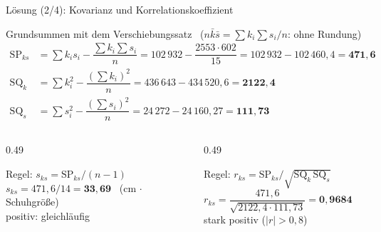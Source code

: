 \documentclass[aspectratio=169,11pt]{beamer}
\newcommand{\SQk}{\text{SQ}_k}
\newcommand{\SQs}{\text{SQ}_s}
\newcommand{\SPks}{\text{SP}_{ks}}
\begin{document}
\begin{frame}{Lösung (2/4): Kovarianz und Korrelationskoeffizient}
  \begin{block}{Grundsummen mit dem Verschiebungssatz \ ($n\bar{k}\bar{s} = \sum k_i \sum s_i / n$: ohne Rundung)}
    \vspace{-8pt}
    \begin{align*}
      \SPks &= \textstyle\sum k_i s_i - \dfrac{\sum k_i \sum s_i}{n} = 102\,932 - \dfrac{2553 \cdot 602}{15} = 102\,932 - 102\,460{,}4 = \mathbf{471{,}6} \\
      \SQk  &= \textstyle\sum k_i^{2} - \dfrac{(\sum k_i)^{2}}{n} = 436\,643 - 434\,520{,}6 = \mathbf{2122{,}4} \\
      \SQs  &= \textstyle\sum s_i^{2} - \dfrac{(\sum s_i)^{2}}{n} = 24\,272 - 24\,160{,}27 = \mathbf{111{,}73}
    \end{align*}
    \vspace{-14pt}
  \end{block}

  \begin{columns}[T]
    \begin{column}{0.49\textwidth}
      \begin{block}{Regel: $s_{ks} = \SPks / (n-1)$}
        $s_{ks} = 471{,}6 / 14 = \mathbf{33{,}69}$ \ (cm $\cdot$ Schuhgröße)\\[2pt]
        positiv: gleichläufig
      \end{block}
    \end{column}
    \begin{column}{0.49\textwidth}
      \begin{block}{Regel: $r_{ks} = \SPks / \sqrt{\SQk\,\SQs}$}
        $r_{ks} = \dfrac{471{,}6}{\sqrt{2122{,}4 \cdot 111{,}73}} = \mathbf{0{,}9684}$\\[2pt]
        stark positiv ($|r| > 0{,}8$)
      \end{block}
    \end{column}
  \end{columns}
\end{frame}
\end{document}
